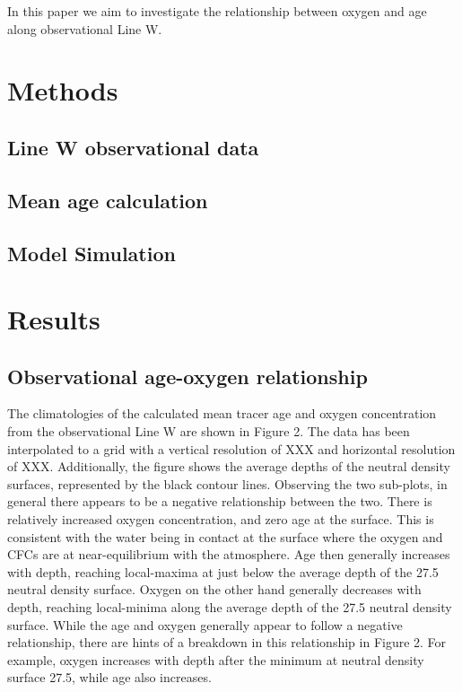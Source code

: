 \documentclass{ametsoc}
\begin{document}
In this paper we aim to investigate the relationship between oxygen and age along observational Line W.




\section{Methods}
\subsection{Line W observational data}
\subsection{Mean age calculation}
\subsection{Model Simulation}


\section{Results}


\subsection{Observational age-oxygen relationship}

The climatologies of the calculated mean tracer age and oxygen concentration from the observational Line W are shown in Figure 2. The data has been interpolated to a grid with a vertical resolution of XXX and horizontal resolution of XXX. Additionally, the figure shows the average depths of the neutral density surfaces, represented by the black contour lines. Observing the two sub-plots, in general there appears to be a negative relationship between the two. There is relatively increased oxygen concentration, and zero age at the surface. This is consistent with the water being in contact at the surface where the oxygen and CFCs are at near-equilibrium with the atmosphere. Age then generally increases with depth, reaching local-maxima at just below the average depth of the 27.5 neutral density surface. Oxygen on the other hand generally decreases with depth, reaching local-minima along the average depth of the 27.5 neutral density surface. While the age and oxygen generally appear to follow a negative relationship, there are hints of a breakdown in this relationship in Figure 2. For example, oxygen increases with depth after the minimum at neutral density surface 27.5, while age also increases.
\end{document}

